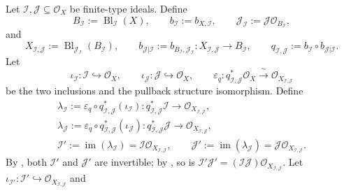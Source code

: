 \begin{definition}
  \label{def:nagata-blowup-product-comparison}
  \lean{}

  Let $\mathcal I,\mathcal J\subseteq\mathcal O_X$ be finite-type ideals.
  Define
  \[
    B_{\mathcal I}:=\operatorname{Bl}_{\mathcal I}(X),\qquad
    b_{\mathcal I}:=b_{X,\mathcal I},\qquad
    \mathcal J_{\mathcal I}:=
      \mathcal J\mathcal O_{B_{\mathcal I}},
  \]
  and
  \[
    X_{\mathcal I,\mathcal J}:=
      \operatorname{Bl}_{\mathcal J_{\mathcal I}}(B_{\mathcal I}),\qquad
    b_{\mathcal J|\mathcal I}:=
      b_{B_{\mathcal I},\mathcal J_{\mathcal I}}\colon
      X_{\mathcal I,\mathcal J}\to B_{\mathcal I},\qquad
    q_{\mathcal I,\mathcal J}:=
      b_{\mathcal I}\circ b_{\mathcal J|\mathcal I}.
  \]
  Let
  \[
    \iota_{\mathcal I}\colon\mathcal I\hookrightarrow\mathcal O_X,\qquad
    \iota_{\mathcal J}\colon\mathcal J\hookrightarrow\mathcal O_X,
    \qquad
    \varepsilon_q\colon
      q_{\mathcal I,\mathcal J}^*\mathcal O_X
      \xrightarrow{\ \sim\ }\mathcal O_{X_{\mathcal I,\mathcal J}}
  \]
  be the two inclusions and the pullback structure isomorphism.  Define
  \[
  \begin{gathered}
    \lambda_{\mathcal I}:=
      \varepsilon_q\circ q_{\mathcal I,\mathcal J}^*
        (\iota_{\mathcal I})\colon
      q_{\mathcal I,\mathcal J}^*\mathcal I
        \longrightarrow\mathcal O_{X_{\mathcal I,\mathcal J}},\\
    \lambda_{\mathcal J}:=
      \varepsilon_q\circ q_{\mathcal I,\mathcal J}^*
        (\iota_{\mathcal J})\colon
      q_{\mathcal I,\mathcal J}^*\mathcal J
        \longrightarrow\mathcal O_{X_{\mathcal I,\mathcal J}},\\
    \mathcal I':=\operatorname{im}(\lambda_{\mathcal I})
      =\mathcal I\mathcal O_{X_{\mathcal I,\mathcal J}},\qquad
    \mathcal J':=\operatorname{im}(\lambda_{\mathcal J})
      =\mathcal J\mathcal O_{X_{\mathcal I,\mathcal J}}.
  \end{gathered}                                               \tag{PCa}
  \]
  By , both $\mathcal I'$ and
  $\mathcal J'$ are invertible; by
  , so is
  $\mathcal I'\mathcal J'=(\mathcal I\mathcal J)
  \mathcal O_{X_{\mathcal I,\mathcal J}}$.  Let
  $\iota_{\mathcal I'}\colon\mathcal I'\hookrightarrow
  \mathcal O_{X_{\mathcal I,\mathcal J}}$ and

\end{definition}
